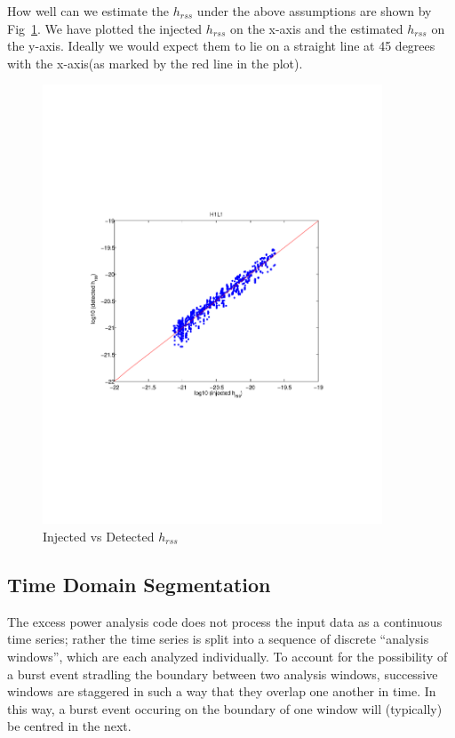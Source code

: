 How well can we estimate the $h_{rss}$ under the above assumptions
are shown by Fig~\ref{fig:hrss}.  We have plotted the injected
$h_{rss}$ on the x-axis and the estimated $h_{rss}$ on the y-axis. Ideally
we would expect them to lie on a straight line at 45 degrees with the
x-axis(as marked by the red line in the plot). 
\begin{figure}
\begin{center}
\includegraphics[width=0.9\textwidth]{figures/inj_det_hrss}
\caption{Injected vs Detected $h_{rss}$}
\label{fig:hrss}
\end{center}
\end{figure}
\clearpage
 
\subsection{Time Domain Segmentation}
The excess power analysis code does not process the input data as a
continuous time series;  rather the time series is split into a sequence of
discrete ``analysis windows'', which are each analyzed individually.  To
account for the possibility of a burst event stradling the boundary between
two analysis windows, successive windows are staggered in such a way that
they overlap one another in time.  In this way, a burst event occuring on
the boundary of one window will (typically) be centred in the next.

